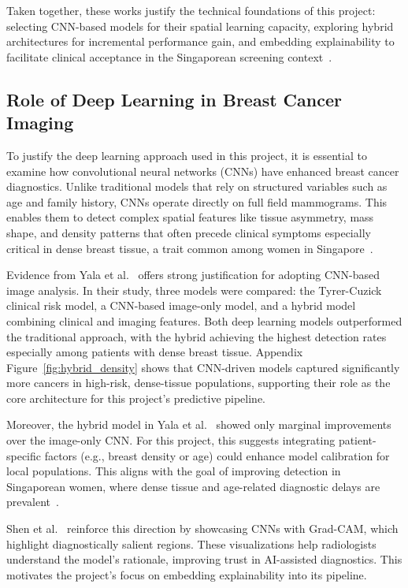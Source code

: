 \documentclass[12pt]{article}
\begin{document}
Taken together, these works justify the technical foundations of this project: selecting CNN-based models for their spatial learning capacity, exploring hybrid architectures for incremental performance gain, and embedding explainability to facilitate clinical acceptance in the Singaporean screening context~\cite{1,6,7}.

\subsection{Role of Deep Learning in Breast Cancer Imaging}

To justify the deep learning approach used in this project, it is essential to examine how convolutional neural networks (CNNs) have enhanced breast cancer diagnostics. Unlike traditional models that rely on structured variables such as age and family history, CNNs operate directly on full field mammograms. This enables them to detect complex spatial features like tissue asymmetry, mass shape, and density patterns that often precede clinical symptoms especially critical in dense breast tissue, a trait common among women in Singapore~\cite{6}.

Evidence from Yala et al.~\cite{1} offers strong justification for adopting CNN-based image analysis. In their study, three models were compared: the Tyrer-Cuzick clinical risk model, a CNN-based image-only model, and a hybrid model combining clinical and imaging features. Both deep learning models outperformed the traditional approach, with the hybrid achieving the highest detection rates especially among patients with dense breast tissue. Appendix Figure~\ref{fig:hybrid_density} shows that CNN-driven models captured significantly more cancers in high-risk, dense-tissue populations, supporting their role as the core architecture for this project’s predictive pipeline.

Moreover, the hybrid model in Yala et al.~\cite{1} showed only marginal improvements over the image-only CNN. For this project, this suggests integrating patient-specific factors (e.g., breast density or age) could enhance model calibration for local populations. This aligns with the goal of improving detection in Singaporean women, where dense tissue and age-related diagnostic delays are prevalent~\cite{6,10}.

Shen et al.~\cite{7} reinforce this direction by showcasing CNNs with Grad-CAM, which highlight diagnostically salient regions. These visualizations help radiologists understand the model’s rationale, improving trust in AI-assisted diagnostics. This motivates the project’s focus on embedding explainability into its pipeline.
\end{document}
